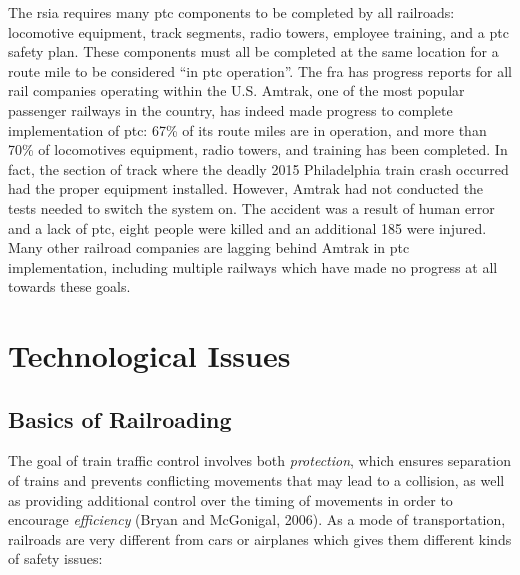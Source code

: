 \documentclass[11pt, titlepage]{article}
\begin{document}
The \gls{rsia} requires many \gls{ptc} components to be completed by all
railroads: locomotive equipment, track segments, radio towers, employee training,
and a \gls{ptc} safety plan. These components must all be completed at the same
location for a route mile to be considered ``in \gls{ptc} operation''. The
\gls{fra} has progress reports for all rail companies operating within the U.S.
Amtrak, one of the most popular passenger railways in the country, has indeed made
progress to complete implementation of \gls{ptc}: 67\% of its route miles are in
operation, and more than 70\% of locomotives equipment, radio towers, and training
has been completed. In fact, the section of track where the deadly 2015
Philadelphia train crash occurred had the proper equipment installed. However,
Amtrak had not conducted the tests needed to switch the system on. The accident
was a result of human error and a lack of \gls{ptc}, eight people were killed and
an additional 185 were injured. Many other railroad companies are lagging behind
Amtrak in \gls{ptc} implementation, including multiple railways which have made no
progress at all towards these goals.

\pagebreak

\section{Technological Issues}

\subsection{Basics of Railroading}

The goal of train traffic control involves both \textit{protection}, which ensures
separation of trains and prevents conflicting movements that may lead to a
collision, as well as providing additional control over the timing of movements in
order to encourage \textit{efficiency} (Bryan and McGonigal, 2006). As a mode of
transportation, railroads are very different from cars or airplanes which gives
them different kinds of safety issues:
\end{document}
